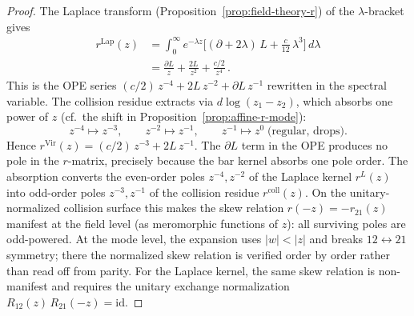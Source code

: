 \begin{proof}
The Laplace transform
\textup{(}Proposition~\textup{\ref{prop:field-theory-r}}\textup{)}
of the $\lambda$-bracket gives
\begin{align*}
 r^{\mathrm{Lap}}(z)
 &= \int_0^\infty e^{-\lambda z}\bigl[
 (\partial + 2\lambda)\,L + \tfrac{c}{12}\,\lambda^3
 \bigr]\,d\lambda \\
 &= \frac{\partial L}{z}
 + \frac{2L}{z^2}
 + \frac{c/2}{z^4}\,.
\end{align*}
This is the OPE series
$(c/2)\,z^{-4} + 2L\,z^{-2} + \partial L\,z^{-1}$
rewritten in the spectral variable.
The collision residue extracts via $d\log(z_1 - z_2)$,
which absorbs one power of $z$
\textup{(}cf.\ the shift in
Proposition~\textup{\ref{prop:affine-r-mode}}\textup{)}:
\[
 z^{-4} \mapsto z^{-3}, \qquad
 z^{-2} \mapsto z^{-1}, \qquad
 z^{-1} \mapsto z^{0}\;\text{(regular, drops)}.
\]
Hence
$r^{\mathrm{Vir}}(z)
= (c/2)\,z^{-3} + 2L\,z^{-1}$.
The $\partial L$ term in the OPE produces
no pole in the $r$-matrix, precisely because the bar kernel
absorbs one pole order. The absorption converts the even-order
poles $z^{-4}, z^{-2}$ of the Laplace kernel $r^L(z)$ into
odd-order poles $z^{-3}, z^{-1}$ of the collision residue
$r^{\mathrm{coll}}(z)$. On the unitary-normalized collision surface
this makes the skew relation $r(-z) = -r_{21}(z)$ manifest at the
field level (as meromorphic functions of $z$): all surviving poles are
odd-powered. At the mode level, the expansion
uses $|w| < |z|$ and breaks $12\leftrightarrow 21$ symmetry;
there the normalized skew relation is verified order by order rather than
read off from parity.
For the Laplace kernel, the same skew relation is non-manifest and
requires the unitary exchange normalization
$R_{12}(z)\,R_{21}(-z) = \mathrm{id}$.
\end{proof}

